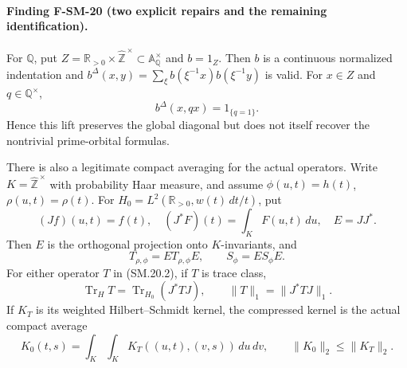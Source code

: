\paragraph{Finding F-SM-20 (two explicit repairs and the remaining identification).}
For $\mathbb Q$, put
$Z=\mathbb R_{>0}\times\widehat{\mathbb Z}^{\,\times}
\subset\mathbb A_{\mathbb Q}^\times$ and $b=1_Z$.
Then $b$ is a continuous normalized indentation and
$b^\Delta(x,y)=\sum_\xi b(\xi^{-1}x)b(\xi^{-1}y)$ is valid.
For $x\in Z$ and $q\in\mathbb Q^\times$,
\[
 b^\Delta(x,qx)=1_{\{q=1\}}.
 \tag{SM.20.1}
\]
Hence this lift preserves the global diagonal but does not itself
recover the nontrivial prime-orbital formulas.

There is also a legitimate compact averaging for the actual operators.
Write $K=\widehat{\mathbb Z}^{\,\times}$ with probability Haar
measure, and assume $\phi(u,t)=h(t)$, $\rho(u,t)=\rho(t)$.
For $H_0=L^2(\mathbb R_{>0},w(t)\,dt/t)$, put
\[
 (Jf)(u,t)=f(t),\quad (J^*F)(t)=\int_KF(u,t)\,du,\quad E=JJ^*.
\]
Then $E$ is the orthogonal projection onto $K$-invariants, and
\[
 T_{\rho,\phi}=ET_{\rho,\phi}E,\qquad S_\phi=ES_\phi E.
 \tag{SM.20.2}
\]
For either operator $T$ in (SM.20.2), if $T$ is trace class,
\[
 \operatorname{Tr}_H T=\operatorname{Tr}_{H_0}(J^*TJ),
 \qquad \|T\|_1=\|J^*TJ\|_1.
 \tag{SM.20.3}
\]
If $K_T$ is its weighted Hilbert--Schmidt kernel, the compressed
kernel is the actual compact average
\[
 K_0(t,s)=\int_K\int_KK_T((u,t),(v,s))\,du\,dv,\qquad
 \|K_0\|_2\leq\|K_T\|_2.
 \tag{SM.20.4}
\]

